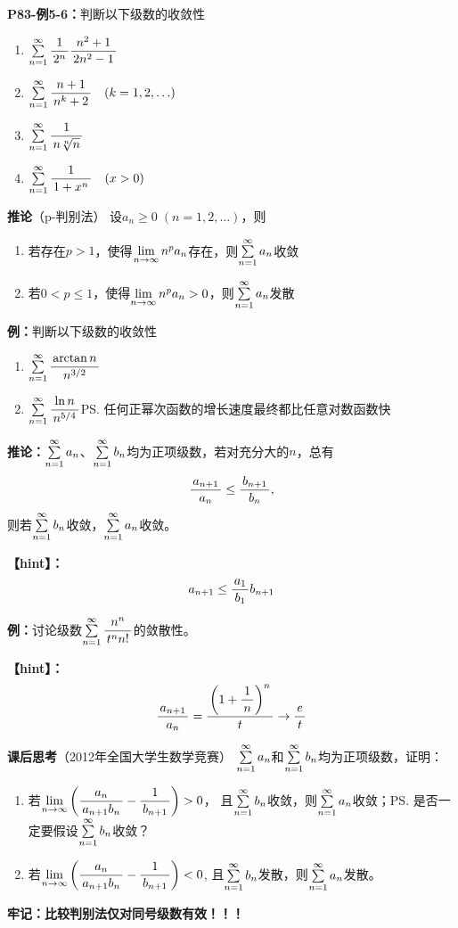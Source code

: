 {\bf P83-例5-6：}判断以下级数的收敛性
\begin{enumerate}[(1)]
  \setlength{\itemindent}{1cm}
  \item $\sumn\df 1{2^n}\df{n^2+1}{2n^2-1}$ 
  \item $\sumn\df{n+1}{n^k+2}\quad (k=1,2,\ldots)$ 
  \item $\sumn\df{1}{n\sqrt[n]{n}}$ 
  \item $\sumn\df{1}{1+x^n}\quad(x>0)$
\end{enumerate}

{\bf 推论}（p-判别法）
设$a_n\geq 0\;(n=1,2,\ldots)$，则 
\begin{enumerate}
  \setlength{\itemindent}{1cm}
  \item 若存在$p>1$，使得$\limn n^pa_n$存在，则$\sumn a_n$收敛 
  \item 若$0<p\leq 1$，使得$\limn n^pa_n>0$，则$\sumn a_n$发散
\end{enumerate}

{\bf 例：}判断以下级数的收敛性
\begin{enumerate}[(1)]
  \setlength{\itemindent}{1cm}
  \item $\sumn\df{\arctan n}{n^{3/2}}$
  \item $\sumn\df{\ln n}{n^{5/4}}$\ps{任何正幂次函数的增长速度最终都比任意对数函数快}
\end{enumerate}

{\bf 推论：}$\sumn a_n$、$\sumn b_n$均为正项级数，若对充分大的$n$，总有
$$\df{a_{n+1}}{a_n}\leq\df{b_{n+1}}{b_n},$$
则若$\sumn b_n$收敛，$\sumn a_n$收敛。

{\bf 【hint】：}
$$a_{n+1}\leq\df{a_1}{b_1}b_{n+1}$$

{\bf 例：}讨论级数$\sumn\df{n^n}{t^nn!}$的敛散性。

{\bf 【hint】：}
$$\df{a_{n+1}}{a_n}=\df{\left(1+\df1n\right)^n}{t}\to\df et$$

{\bf 课后思考}（2012年全国大学生数学竞赛）
$\sumn a_n$和$\sumn b_n$均为正项级数，证明：
\begin{enumerate}
  \setlength{\itemindent}{1cm}
  \item 若$\limn\left(\df{a_n}{a_{n+1}b_n}-\df 1{b_{n+1}}\right)>0$，
  且$\sumn b_n$收敛，则$\sumn a_n$收敛；\ps{是否一定要假设$\sumn b_n$收敛？}
  \item 若$\limn\left(\df{a_n}{a_{n+1}b_n}-\df 1{b_{n+1}}\right)<0$,
  且$\sumn b_n$发散，则$\sumn a_n$发散。
\end{enumerate}

{\bf 牢记：比较判别法仅对同号级数有效！！！}

